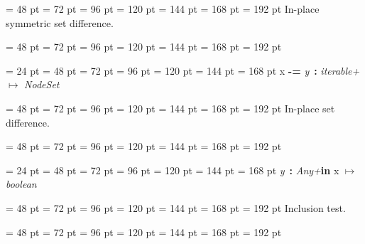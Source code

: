 {{{{\par \noindent  \leftskip = 48 pt  \leftmargini = 72 pt  \leftmarginii = 96 pt  \leftmarginiii = 120 pt  \leftmarginiv = 144 pt  \leftmarginv = 168 pt  \leftmarginvi = 192 pt 
In-place symmetric set difference.\par}
{\par \noindent  \leftskip = 48 pt  \leftmargini = 72 pt  \leftmarginii = 96 pt  \leftmarginiii = 120 pt  \leftmarginiv = 144 pt  \leftmarginv = 168 pt  \leftmarginvi = 192 pt {\par \noindent
\par}
\par}
\par}
\par}
{\par \noindent  \leftskip = 24 pt  \leftmargini = 48 pt  \leftmarginii = 72 pt  \leftmarginiii = 96 pt  \leftmarginiv = 120 pt  \leftmarginv = 144 pt  \leftmarginvi = 168 pt x {\large {\bf -=\/}} {\em y\/}~{\bf :}  {\em iterable+\/} \(\mapsto \)  {\em NodeSet\/}{\par \noindent
{\par \noindent  \leftskip = 48 pt  \leftmargini = 72 pt  \leftmarginii = 96 pt  \leftmarginiii = 120 pt  \leftmarginiv = 144 pt  \leftmarginv = 168 pt  \leftmarginvi = 192 pt 
In-place set difference.\par}
{\par \noindent  \leftskip = 48 pt  \leftmargini = 72 pt  \leftmarginii = 96 pt  \leftmarginiii = 120 pt  \leftmarginiv = 144 pt  \leftmarginv = 168 pt  \leftmarginvi = 192 pt {\par \noindent
\par}
\par}
\par}
\par}
{\par \noindent  \leftskip = 24 pt  \leftmargini = 48 pt  \leftmarginii = 72 pt  \leftmarginiii = 96 pt  \leftmarginiv = 120 pt  \leftmarginv = 144 pt  \leftmarginvi = 168 pt {\em y\/}~{\bf :}  {\em Any+\/}{\large  {\bf in\/} }x \(\mapsto \)  {\em boolean\/}{\par \noindent
{\par \noindent  \leftskip = 48 pt  \leftmargini = 72 pt  \leftmarginii = 96 pt  \leftmarginiii = 120 pt  \leftmarginiv = 144 pt  \leftmarginv = 168 pt  \leftmarginvi = 192 pt 
Inclusion test.\par}
{\par \noindent  \leftskip = 48 pt  \leftmargini = 72 pt  \leftmarginii = 96 pt  \leftmarginiii = 120 pt  \leftmarginiv = 144 pt  \leftmarginv = 168 pt  \leftmarginvi = 192 pt {\par \noindent
}}}}}
